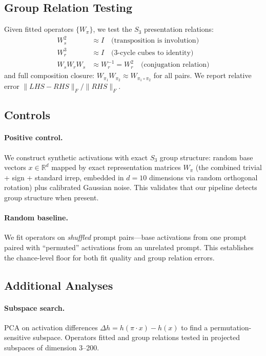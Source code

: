 \documentclass[10pt, letterpaper]{article}
\begin{document}
\subsection{Group Relation Testing}

Given fitted operators $\{W_\pi\}$, we test the $S_3$ presentation relations:
\begin{align}
    W_s^2 &\approx I \quad \text{(transposition is involution)} \\
    W_r^3 &\approx I \quad \text{(3-cycle cubes to identity)} \\
    W_s W_r W_s &\approx W_r^{-1} = W_r^2 \quad \text{(conjugation relation)}
\end{align}
and full composition closure: $W_{\pi_1} W_{\pi_2} \approx W_{\pi_1 \circ \pi_2}$ for all pairs. We report relative error $\|LHS - RHS\|_F / \|RHS\|_F$.

\subsection{Controls}

\paragraph{Positive control.} We construct synthetic activations with exact $S_3$ group structure: random base vectors $x \in \mathbb{R}^d$ mapped by exact representation matrices $W_\pi$ (the combined trivial + sign + standard irrep, embedded in $d = 10$ dimensions via random orthogonal rotation) plus calibrated Gaussian noise. This validates that our pipeline detects group structure when present.

\paragraph{Random baseline.} We fit operators on \emph{shuffled} prompt pairs---base activations from one prompt paired with ``permuted'' activations from an unrelated prompt. This establishes the chance-level floor for both fit quality and group relation errors.

\subsection{Additional Analyses}

\paragraph{Subspace search.} PCA on activation differences $\Delta h = h(\pi \cdot x) - h(x)$ to find a permutation-sensitive subspace. Operators fitted and group relations tested in projected subspaces of dimension 3--200.
\end{document}

